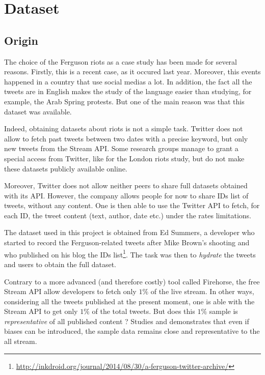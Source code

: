 \documentclass[a4paper,twoside,12pt,openright]{report}
\begin{document}
\chapter{Dataset}

\section{Origin}
The choice of the Ferguson riots as a case study has been made for several reasons. Firstly, this is a recent case, as it occured last year. Moreover, this events happened in a country that use social medias a lot. In addition, the fact all the tweets are in English makes the study of the language easier than studying, for example, the Arab Spring protests. But one of the main reason was that this dataset was available.

Indeed, obtaining datasets about riots is not a simple task. Twitter does not allow to fetch past tweets between two dates with a precise keyword, but only new tweets from the Stream API. Some research groups manage to grant a special access from Twitter, like for the London riots study\cite{procter2013reading}, but do not make these datasets publicly available online.

Moreover, Twitter does not allow neither peers to share full datasets obtained with its API. However, the company allows people for now to share IDs list of tweets, without any content. One is then able to use the Twitter API to fetch, for each ID, the tweet content (text, author, date etc.) under the rates limitations.

The dataset used in this project is obtained from Ed Summers, a developer who started to record the Ferguson-related tweets after Mike Brown's shooting and who published on his blog the IDs list\footnote{\url{http://inkdroid.org/journal/2014/08/30/a-ferguson-twitter-archive/}}. The task was then to \emph{hydrate} the tweets and users to obtain the full dataset.

Contrary to a more advanced (and therefore costly) tool called Firehorse, the free Stream API allow developers to fetch only $1\%$ of the live stream. In other ways, considering all the tweets published at the present moment, one is able with the Stream API to get only $1\%$ of the total tweets. But does this $1\%$ sample is \emph{representative} of all published content ? Studies \cite{DBLP:journals/corr/MorstatterPLC13} and \cite{morstatter2014biased} demonstrates that even if biases can be introduced, the sample data remains close and representative to the all stream.
\end{document}
